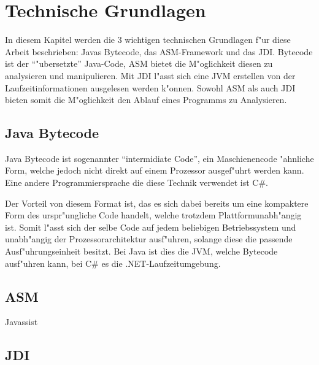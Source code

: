 
\chapter{Technische Grundlagen}

In diesem Kapitel werden die 3 wichtigen technischen Grundlagen f"ur diese Arbeit beschrieben: Javas Bytecode, das ASM-Framework und das \ac{JDI}. Bytecode ist der "`"ubersetzte"' Java-Code, ASM bietet die M"oglichkeit diesen zu analysieren und manipulieren. Mit \ac{JDI} l"asst sich eine \ac{JVM} erstellen von der Laufzeitinformationen ausgelesen werden k"onnen. Sowohl ASM als auch \ac{JDI} bieten somit die M"oglichkeit den Ablauf eines Programms zu Analysieren.

\section{Java Bytecode} 

Java Bytecode ist sogenannter "`intermidiate Code"', ein Maschienencode "ahnliche Form, welche jedoch nicht direkt auf einem Prozessor ausgef"uhrt werden kann. Eine andere Programmiersprache die diese Technik verwendet ist C\#.

Der Vorteil von diesem Format ist, das es sich dabei bereits um eine kompaktere Form des urspr"ungliche Code handelt, welche trotzdem Plattformunabh"angig ist. Somit l"asst sich der selbe Code auf jedem beliebigen Betriebssystem und unabh"angig der Prozessorarchitektur ausf"uhren, solange diese die passende Ausf"uhrungseinheit besitzt.
Bei Java ist dies die \ac{JVM}, welche Bytecode ausf"uhren kann, bei C\# es die .NET-Laufzeitumgebung. 

\section{ASM} 

Javassist

\section{JDI} 

